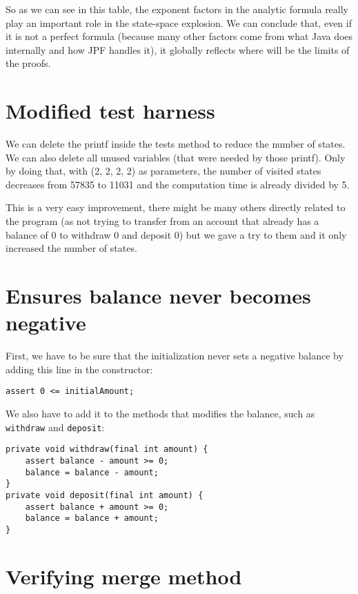 \documentclass[11pt, a4paper]{article}
\begin{document}
    So as we can see in this table, the exponent factors in the analytic
    formula really play an important role in the state-space explosion. We can
    conclude that, even if it is not a perfect formula (because many other
    factors come from what Java does internally and how JPF handles it),
    it globally reflects where will be the limits of the proofs.

    \section{Modified test harness}

    We can delete the printf inside the tests method to reduce the number of
    states. We can also delete all unused variables (that were needed by
    those printf). Only by doing that, with (2, 2, 2, 2) as parameters, the
    number of visited states decreases from 57835 to 11031 and the computation
    time is already divided by 5. \newline

    This is a very easy improvement, there might be many others directly
    related to the program (as not trying to transfer from an account that
    already has a balance of 0 to withdraw 0 and deposit 0) but we gave a try
    to them and it only increased the number of states.

    \section{Ensures balance never becomes negative}

    First, we have to be sure that the initialization never sets a negative
    balance by adding this line in the constructor:

    \begin{lstlisting}
assert 0 <= initialAmount;
    \end{lstlisting}

    We also have to add it to the methods that modifies the balance, such as
    \verb#withdraw# and \verb#deposit#:

    \begin{lstlisting}
private void withdraw(final int amount) {
    assert balance - amount >= 0;
    balance = balance - amount;
}
private void deposit(final int amount) {
    assert balance + amount >= 0;
    balance = balance + amount;
}
    \end{lstlisting}

    \section{Verifying merge method}
\end{document}
